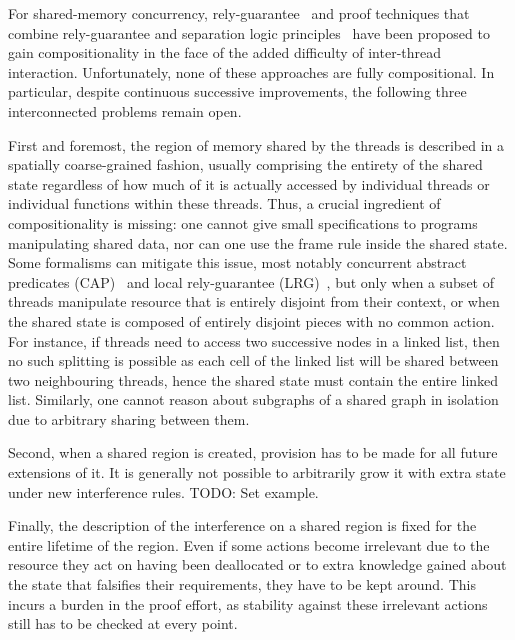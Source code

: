 For shared-memory concurrency, rely-guarantee~\cite{rg} and proof
techniques that combine rely-guarantee and separation logic
principles~\cite{viktor-marriage,dg,lrg,cap-ecoop10,icap,tada} have
been proposed to gain compositionality in the face of the added
difficulty of inter-thread interaction. Unfortunately, none of these
approaches are fully compositional. In particular, despite continuous
successive improvements, the following three interconnected problems
remain open.

First and foremost, the region of memory shared by the threads is
described in a spatially coarse-grained fashion, usually comprising
the entirety of the shared state regardless of how much of it is
actually accessed by individual threads or individual functions within
these threads. Thus, a crucial ingredient of compositionality is
missing: one cannot give small specifications to programs manipulating
shared data, nor can one use the frame rule inside the shared
state. Some formalisms can mitigate this issue, most notably
concurrent abstract predicates (CAP)~\cite{cap-ecoop10} and local
rely-guarantee (LRG)~\cite{lrg}, but only when a subset of threads
manipulate resource that is entirely disjoint from their context, or
when the shared state is composed of entirely disjoint pieces with no
common action. For instance, if threads need to access two successive
nodes in a linked list, then no such splitting is possible as each
cell of the linked list will be shared between two neighbouring
threads, hence the shared state must contain the entire linked
list. Similarly, one cannot reason about subgraphs of a shared graph
in isolation due to arbitrary sharing between them.

Second, when a shared region is created, provision has to be made for
all future extensions of it. It is generally not possible to
arbitrarily grow it with extra state under new interference rules.
TODO: Set example.

Finally, the description of the interference on a shared region is
fixed for the entire lifetime of the region. Even if some actions
become irrelevant due to the resource they act on having been
deallocated or to extra knowledge gained about the state that
falsifies their requirements, they have to be kept around. This incurs
a burden in the proof effort, as stability against these irrelevant
actions still has to be checked at every point.



